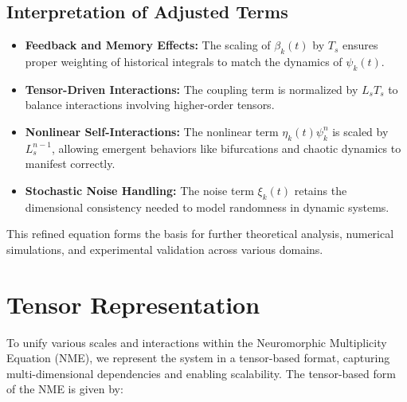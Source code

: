\documentclass{article}
\theoremstyle{plain}
\begin{document}
\subsection{Interpretation of Adjusted Terms}
\begin{itemize}
    \item \textbf{Feedback and Memory Effects:} The scaling of \(\beta_k(t)\) by \(T_s\) ensures proper weighting of historical integrals to match the dynamics of \(\psi_k(t)\).
    \item \textbf{Tensor-Driven Interactions:} The coupling term is normalized by \(L_s T_s\) to balance interactions involving higher-order tensors.
    \item \textbf{Nonlinear Self-Interactions:} The nonlinear term \(\eta_k(t) \psi_k^n\) is scaled by \(L_s^{n-1}\), allowing emergent behaviors like bifurcations and chaotic dynamics to manifest correctly.
    \item \textbf{Stochastic Noise Handling:} The noise term \(\xi_k(t)\) retains the dimensional consistency needed to model randomness in dynamic systems.
\end{itemize}
This refined equation forms the basis for further theoretical analysis, numerical simulations, and experimental validation across various domains.


\section{Tensor Representation}

To unify various scales and interactions within the Neuromorphic Multiplicity Equation (NME), we represent the system in a tensor-based format, capturing multi-dimensional dependencies and enabling scalability. The tensor-based form of the NME is given by:
\end{document}
